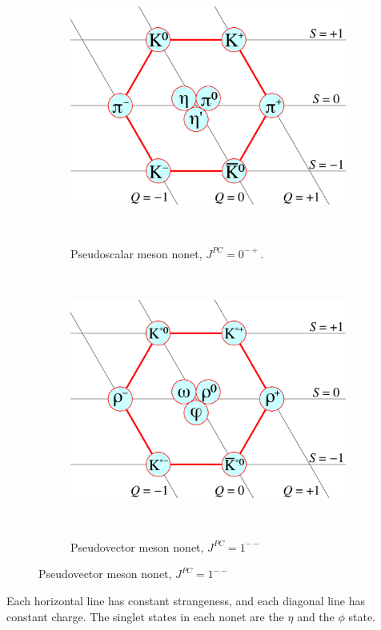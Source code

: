 \documentclass[11pt, oneside]{article}   	%
\theoremstyle{definition}
\numberwithin{equation}{subsection}		%
\begin{document}
\begin{figure}[H]
	\centering
	\begin{subfigure}[t]{.38\textwidth}
		\centering
		\includegraphics[width = .8\textwidth]{scalar_meson_nonet}
		\caption{Pseudoscalar meson nonet, $J^{PC} = 0^{-+}$.}~
		\label{subfig:scalar_meson_nonet}
	\end{subfigure}
	~
	\begin{subfigure}[t]{.38\textwidth}
		\centering
		\includegraphics[width = .8\textwidth]{vector_meson_nonet}
		\caption{Pseudovector meson nonet, $J^{PC} = 1^{--}$}~
		\label{subfig:vector_meson_nonet}
	\end{subfigure}
\end{figure}
Each horizontal line has constant strangeness, and each diagonal line has constant charge. The singlet states in each nonet are the 
$\eta$ and the $\phi$ state. 
\end{document}
